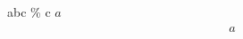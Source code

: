 \documentclass{article}
\begin{document}
  abc \% c $a$
  \begin{align}
    \begin{split}
      a
    \end{split}
  \end{align}
\end{document}
